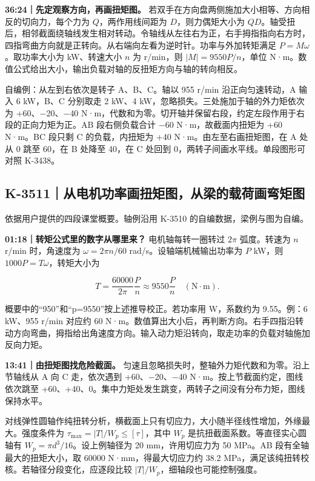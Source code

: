 \documentclass[zihao=5,a4paper,UTF8,fontset=fandol]{ctexart}
\begin{document}
\textbf{36:24｜先定观察方向，再画扭矩图。} 若双手在方向盘两侧施加大小相等、方向相反的切向力，每个力为 $Q$，两作用线间距为 $D$，则力偶矩大小为 $QD$。轴受扭后，相邻截面绕轴线发生相对转动。令轴线从左往右为正，右手拇指指向右方时，四指弯曲方向就是正转向。从右端向左看为逆时针。功率与外加转矩满足 $P=M\omega$。取功率大小为 kW、转速大小 $n$ 为 r/min，则 $|M|=9550P/n$，单位 N·m。数值公式给出大小，输出负载对轴的反扭矩方向与轴的转向相反。


自编例：从左到右依次是转子 A、B、C。轴以 955 r/min 沿正向匀速转动，A 输入 6 kW，B、C 分别取走 2 kW、4 kW，忽略损失。三处施加于轴的外力矩依次为 +60、$-$20、$-$40 N·m，代数和为零。切开轴并保留右段，约定左段作用于右段的正向力矩为正。AB 段右侧负载合计 $-$60 N·m，故截面内扭矩为 +60 N·m。BC 段只剩 C 的负载，内扭矩为 +40 N·m。由左至右画扭矩图，在 A 处从 0 跳至 60，在 B 处降至 40，在 C 处回到 0，两转子间画水平线。单段图形可对照 K-3438。





\subsection{K-3511｜从电机功率画扭矩图，从梁的载荷画弯矩图}
\label{k-3511}

依据用户提供的四段课堂概要。轴例沿用 K-3510 的自编数据，梁例与图为自编。


\textbf{01:18｜转矩公式里的数字从哪里来？} 电机轴每转一圈转过 $2\pi$ 弧度。转速为 $n$ r/min 时，角速度为 $\omega=2\pi n/60$ rad/s。设轴端机械输出功率为 $P$ kW，则 $1000P=T\omega$，转矩大小为


\[T=\frac{60000}{2\pi}\frac{P}{n}\approx9550\frac{P}{n}\quad(\mathrm{N\cdot m}).\]


概要中的“950”和“p=9550”按上述推导校正。若功率用 W，系数约为 9.55。例：6 kW、955 r/min 对应约 60 N·m。数值算出大小后，再判断方向。右手四指沿转动方向弯曲，拇指给出角速度方向。输入动力矩沿转向，取走功率的负载对轴施加反向力矩。


\textbf{13:41｜由扭矩图找危险截面。} 匀速且忽略损失时，整轴外力矩代数和为零。沿上节轴线从 A 向 C 走，依次遇到 +60、$-$20、$-$40 N·m。按上节截面约定，图线依次跳至 +60、+40、0。集中力矩处发生跳变，两转子之间没有分布力矩，图线保持水平。


对线弹性圆轴作纯扭转分析，横截面上只有切应力，大小随半径线性增加，外缘最大。强度条件为 $\tau_{\max}=|T|/W_p\leq[\tau]$，其中 $W_p$ 是抗扭截面系数。等直径实心圆轴有 $W_p=\pi d^3/16$。设上例轴径为 20 mm，许用切应力为 50 MPa。AB 段有全轴最大的扭矩大小，取 60000 N·mm，得最大切应力约 38.2 MPa，满足该纯扭转校核。若轴径分段变化，应逐段比较 $|T|/W_p$，细轴段也可能控制强度。
\end{document}
